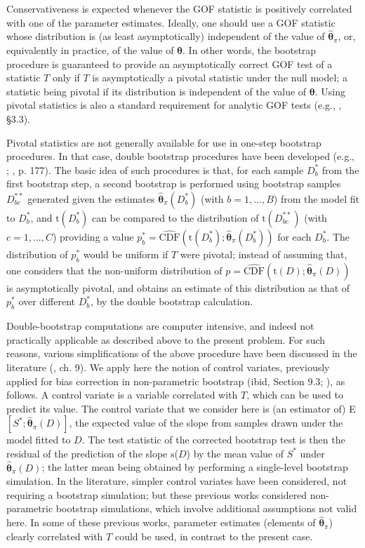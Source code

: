 \documentclass[a4paper]{article}\usepackage[]{graphicx}\usepackage[]{color}
\newcommand{\data}{\ensuremath{D}}
\newcommand{\datab}{\ensuremath{D_{b}^*}}
\newcommand{\databb}{\ensuremath{D_{bc}^{**}}}
\newcommand{\boo}[1]{\ensuremath{{#1}_{b}^{*}}}
\newcommand{\CDF}{\ensuremath{\mathrm{CDF}}}
\newcommand{\sfn}{\ensuremath{\mathrm{s}}}
\newcommand{\tfn}{\ensuremath{\mathrm{t}}}
\newcommand{\bth}{\ensuremath{\boldsymbol{\theta}}}
\begin{document}
Conservativeness is expected whenever the GOF statistic is positively correlated with one of the parameter estimates. Ideally, one should use a GOF statistic whose distribution is (as least asymptotically) independent of the value of $\hat{\bth}_\pi$, or, equivalently in practice, of the value of $\bth$. In other words, the bootstrap procedure is guaranteed to provide an asymptotically correct GOF test of a statistic $T$ only if $T$ is asymptotically a pivotal statistic under the null model; a statistic being pivotal if its distribution is independent of the value of $\bth$. Using pivotal statistics is also a standard requirement for analytic GOF tests (e.g., \citealp{CoxH74}, §3.3).

Pivotal statistics are not generally available for use in one-step bootstrap procedures. In that case, double bootstrap procedures have been developed (e.g., \citealp{Beran88}; \citealp{DavisonH97}, p. 177).  The basic idea of such procedures is that, for each sample $\datab$ from the first bootstrap step, a second bootstrap is performed using bootstrap samples $\databb$ generated given the estimates $\hat{\bth}_\pi(\datab)$ (with $b=1,\ldots,B$) from the model fit to $\datab$, and $\tfn(\datab)$ can be compared to the distribution of $\tfn(\databb)$ (with $c=1,\ldots,C$) providing a value $\boo{p} = \hat{\CDF}(\tfn(\datab);\hat{\bth}_\pi(\datab) )$ for each $\datab$. The distribution of $\boo{p}$ would be uniform if $T$ were pivotal; instead of assuming that, one considers that the non-uniform distribution of $p= \hat{\CDF}(\tfn(\data);\hat{\bth}_\pi(\data))$ is asymptotically pivotal, and obtains an estimate of this distribution as that of \boo{p} over different $\datab$, by the double bootstrap calculation.

Double-bootstrap computations are computer intensive, and indeed not practically applicable as described above to the present problem. For such reasons, various simplifications of the above procedure have been discussed in the literature (\citealp{DavisonH97}, ch. 9). We apply here the notion of control variates, previously applied for bias correction in non-parametric bootstrap (ibid, Section 9.3; \citealp{Efron90}), as follows. A control variate is a variable correlated with $T$, which can be used to predict its value. The control variate that we consider here is (an estimator of) E$[S^*;\hat{\bth}_\pi(\data)]$, the expected value of the slope from samples drawn under the model fitted to \data. The test statistic of the corrected bootstrap test is then the residual of the prediction of the slope \sfn(\data)  by the mean value of $S^*$ under $\hat{\bth}_\pi(\data)$; the latter mean being obtained by performing a single-level bootstrap simulation. In the literature, simpler control variates have been considered, not requiring a bootstrap simulation; but these previous works considered non-parametric bootstrap simulations, which involve additional assumptions not valid here. In some of these previous works, parameter estimates (elements of $\hat{\bth}_\pi$) clearly correlated with $T$ could be used, in contrast to the present case.
\end{document}

